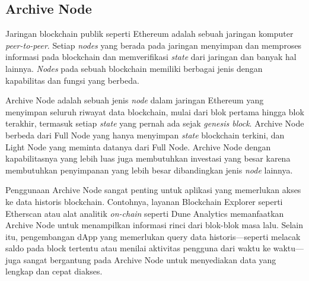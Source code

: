 \subsection{Archive Node}
\label{subsec:archive-node}

Jaringan blockchain publik seperti Ethereum adalah sebuah jaringan komputer \textit{peer-to-peer}. Setiap \textit{nodes} yang berada pada jaringan menyimpan dan memproses informasi pada blockchain dan memverifikasi \textit{state} dari jaringan dan banyak hal lainnya. \textit{Nodes} pada sebuah blockchain memiliki berbagai jenis dengan kapabilitas dan fungsi yang berbeda.

Archive Node adalah sebuah jenis \textit{node} dalam jaringan Ethereum yang menyimpan seluruh riwayat data blockchain, mulai dari blok pertama hingga blok terakhir, termasuk setiap \textit{state} yang pernah ada sejak \textit{genesis block}. Archive Node berbeda dari Full Node yang hanya menyimpan \textit{state} blockchain terkini, dan Light Node yang meminta datanya dari Full Node. Archive Node dengan kapabilitasnya yang lebih luas juga membutuhkan investasi yang besar karena membutuhkan penyimpanan yang lebih besar dibandingkan jenis \textit{node} lainnya.

Penggunaan Archive Node sangat penting untuk aplikasi yang memerlukan akses ke data historis blockchain. Contohnya, layanan Blockchain Explorer seperti Etherscan atau alat analitik \textit{on-chain} seperti Dune Analytics memanfaatkan Archive Node untuk menampilkan informasi rinci dari blok-blok masa lalu. Selain itu, pengembangan dApp yang memerlukan query data historis—seperti melacak saldo pada block tertentu atau menilai aktivitas pengguna dari waktu ke waktu—juga sangat bergantung pada Archive Node untuk menyediakan data yang lengkap dan cepat diakses.
